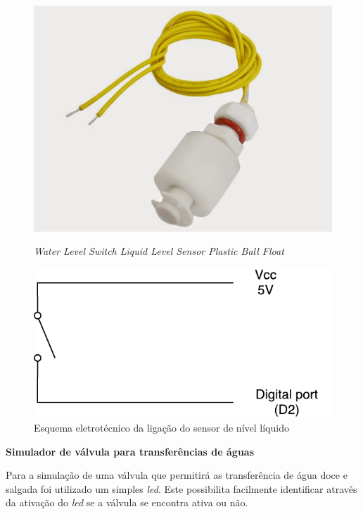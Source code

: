\begin{figure}[h]
	\centering
	\begin{minipage}[b]{0.4\textwidth}
		\includegraphics[width=\textwidth]{img/hardware/liquido.JPG}
		\caption{\textit{Water Level Switch Liquid Level Sensor Plastic Ball Float}}
	\end{minipage}
	\hfill
	\begin{minipage}[b]{0.4\textwidth}
		\includegraphics[width=\textwidth]{img/hardware/sw_esquema.pdf}
		\caption{Esquema eletrotécnico da ligação do sensor de nível líquido}
		\label{esquem-liquido}
	\end{minipage}
\end{figure}



\textbf{Simulador de válvula para transferências de águas}

Para a simulação de uma válvula que permitirá as transferência de água doce e salgada foi utilizado um simples \textit{led}. Este possibilita facilmente identificar através da ativação do \textit{led} se a válvula se encontra ativa ou não. 


